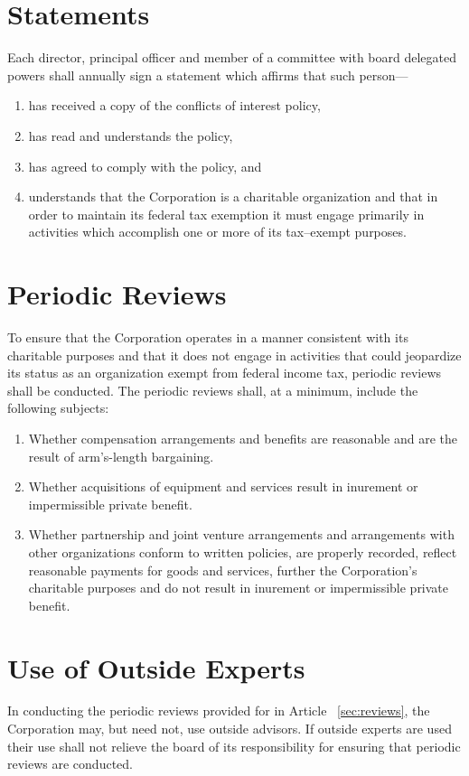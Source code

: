 \documentclass[12pt]{article}
\begin{document}
\section{Statements}

Each director, principal officer and member of a committee with 
board delegated powers shall annually sign a statement which 
affirms that such person---

\begin{enumerate}
\item has received a copy of the conflicts of interest policy, 

\item has read and understands the policy, 

\item has agreed to comply with the policy, and 

\item understands that the Corporation is a charitable 
organization and that in order to maintain its federal tax 
exemption it must engage primarily in activities which accomplish 
one or more of its tax--exempt purposes. 
\end{enumerate}

\section{Periodic Reviews}\label{sec:reviews}

To ensure that the Corporation operates in a manner consistent 
with its charitable purposes and that it does not engage in 
activities that could jeopardize its status as an organization 
exempt from federal income tax, periodic reviews shall be 
conducted. The periodic reviews shall, at a minimum, include the 
following subjects: 

\begin{enumerate}
\item Whether compensation arrangements and benefits are 
reasonable and are the result of arm's-length bargaining. 

\item Whether acquisitions of equipment and services result in 
inurement or impermissible private benefit. 

\item Whether partnership and joint venture arrangements and 
arrangements with other organizations conform to written 
policies, are properly recorded, reflect reasonable payments for 
goods and services, further the Corporation's charitable purposes 
and do not result in inurement or impermissible private benefit. 

\end{enumerate}

\section{Use of Outside Experts}\label{sec:experts}

In conducting the periodic reviews provided for in Article~
\vref{sec:reviews}, the Corporation may, but need not, use 
outside advisors. If outside experts are used their use shall not 
relieve the board of its responsibility for ensuring that 
periodic reviews are conducted. 
\end{document}

